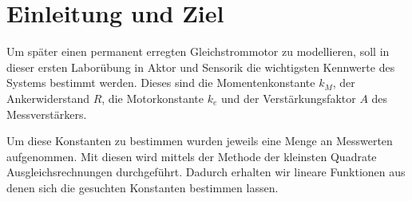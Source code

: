 \section{Einleitung und Ziel}

Um später einen permanent erregten Gleichstrommotor zu modellieren, soll
in dieser ersten Laborübung in Aktor und Sensorik die wichtigsten
Kennwerte des Systems bestimmt werden. Dieses sind die Momentenkonstante
$k_M$, der Ankerwiderstand $R$, die Motorkonstante $k_e$ und der
Verstärkungsfaktor $A$ des Messverstärkers. 

Um diese Konstanten zu bestimmen wurden jeweils eine Menge an Messwerten
aufgenommen. Mit diesen wird mittels der Methode der kleinsten Quadrate 
Ausgleichsrechnungen durchgeführt. Dadurch erhalten wir lineare Funktionen
aus denen sich die gesuchten Konstanten bestimmen lassen.